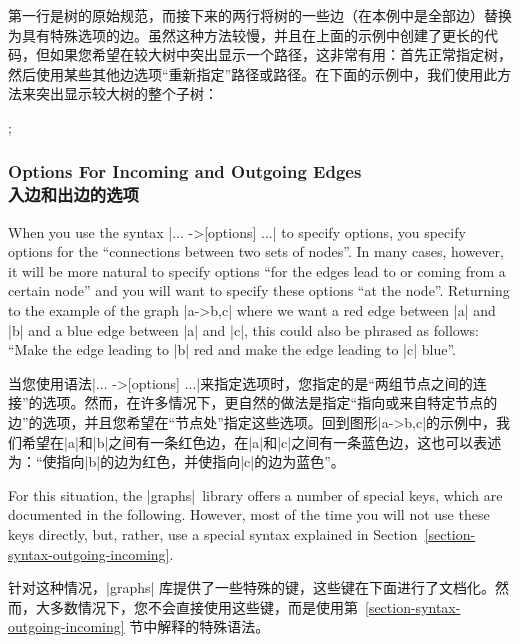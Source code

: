 第一行是树的原始规范，而接下来的两行将树的一些边（在本例中是全部边）替换为具有特殊选项的边。虽然这种方法较慢，并且在上面的示例中创建了更长的代码，但如果您希望在较大树中突出显示一个路径，这非常有用：首先正常指定树，然后使用某些其他边选项“重新指定”路径或路径。在下面的示例中，我们使用此方法来突出显示较大树的整个子树：


\begin{codeexample}[preamble={\usetikzlibrary{graphs}}]
\tikz {};
\end{codeexample}


\subsubsection{Options For Incoming and Outgoing Edges\\入边和出边的选项}

When you use the syntax |... ->[options] ...| to specify options, you specify
options for the ``connections between two sets of nodes''. In many cases,
however, it will be more natural to specify options ``for the edges lead to or
coming from a certain node'' and you will want to specify these options ``at
the node''. Returning to the example of the graph |a->{b,c}| where we want a
red edge between |a| and |b| and a blue edge between |a| and |c|, this could
also be phrased as follows: ``Make the edge leading to |b| red and make the
edge leading to |c| blue''.

当您使用语法|... ->[options] ...|来指定选项时，您指定的是“两组节点之间的连接”的选项。然而，在许多情况下，更自然的做法是指定“指向或来自特定节点的边”的选项，并且您希望在“节点处”指定这些选项。回到图形|a->{b,c}|的示例中，我们希望在|a|和|b|之间有一条红色边，在|a|和|c|之间有一条蓝色边，这也可以表述为：“使指向|b|的边为红色，并使指向|c|的边为蓝色”。

For this situation, the |graphs| library offers a number of special keys, which
are documented in the following. However, most of the time you will not use
these keys directly, but, rather, use a special syntax explained in
Section~\ref{section-syntax-outgoing-incoming}.

针对这种情况，|graphs| 库提供了一些特殊的键，这些键在下面进行了文档化。然而，大多数情况下，您不会直接使用这些键，而是使用第~\ref{section-syntax-outgoing-incoming} 节中解释的特殊语法。


